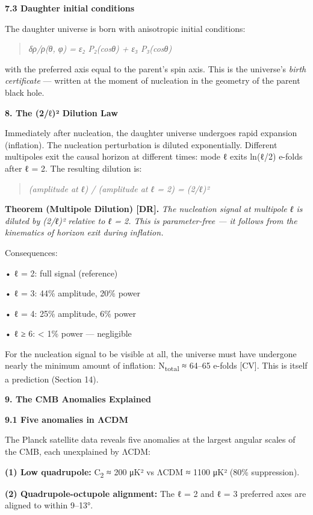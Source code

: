 \documentclass[12pt,a4paper]{article}
\begin{document}
\textbf{7.3 Daughter initial conditions}

The daughter universe is born with anisotropic initial conditions:

\begin{quote}
\emph{δρ/ρ(θ, φ) = ε₂ P₂(cosθ) + ε₃ P₃(cosθ)}
\end{quote}

with the preferred axis equal to the parent's spin axis. This is the
universe's \emph{birth certificate} --- written at the moment of
nucleation in the geometry of the parent black hole.

\textbf{8. The (2/ℓ)² Dilution Law}

Immediately after nucleation, the daughter universe undergoes rapid
expansion (inflation). The nucleation perturbation is diluted
exponentially. Different multipoles exit the causal horizon at different
times: mode ℓ exits ln(ℓ/2) e-folds after ℓ = 2. The resulting dilution
is:

\begin{quote}
\emph{(amplitude at ℓ) / (amplitude at ℓ = 2) = (2/ℓ)²}
\end{quote}

\textbf{Theorem (Multipole Dilution) {[}DR{]}.} \emph{The nucleation
signal at multipole ℓ is diluted by (2/ℓ)² relative to ℓ = 2. This is
parameter-free --- it follows from the kinematics of horizon exit during
inflation.}

Consequences:

• ℓ = 2: full signal (reference)

• ℓ = 3: 44\% amplitude, 20\% power

• ℓ = 4: 25\% amplitude, 6\% power

• ℓ ≥ 6: \textless{} 1\% power --- negligible

For the nucleation signal to be visible at all, the universe must have
undergone nearly the minimum amount of inflation: N\textsubscript{total}
≈ 64--65 e-folds {[}CV{]}. This is itself a prediction (Section 14).

\textbf{9. The CMB Anomalies Explained}

\textbf{9.1 Five anomalies in ΛCDM}

The Planck satellite data reveals five anomalies at the largest angular
scales of the CMB, each unexplained by ΛCDM:

\textbf{(1) Low quadrupole:} C\textsubscript{2} ≈ 200 μK² vs ΛCDM ≈ 1100
μK² (80\% suppression).

\textbf{(2) Quadrupole-octupole alignment:} The ℓ = 2 and ℓ = 3
preferred axes are aligned to within 9--13°.
\end{document}

